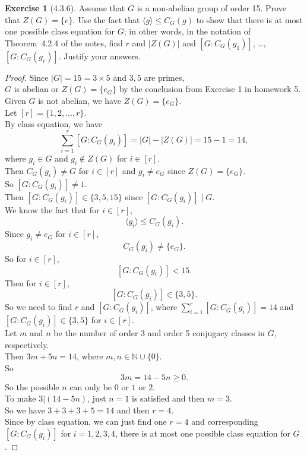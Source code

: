 \documentclass{amsart}
\newcommand{\bbn}{\mathbb{N}}
\theoremstyle{plain}
\theoremstyle{definition}
\newtheorem{exer}[lem]{Exercise}
\begin{document}
\begin{exer}[4.3.6]
Assume that $G$ is a non-abelian group of order 15. 
Prove that $Z(G)=\{e\}$. 
Use the fact that $\langle g\rangle\leq C_G(g)$ to show that there is at most one possible class equation for $G$;
in other words, in the notation of Theorem~4.2.4 of the notes, find $r$ and $|Z(G)|$ and $[G:C_G(g_1)]$, \ldots, $[G:C_G(g_r)]$.
Justify your answers.

\begin{proof}
	Since $|G| = 15 = 3 \times 5$ and $3,5$ are primes, \\
	$G$ is abelian or $Z(G)= \{e_G\}$ by the conclusion from Exercise 1 in homework 5.\\
	Given $G$ is not abelian, we have $Z(G)=\{e_G\}$.\\
	Let $[r] = \{1,2,...,r\}$.\\
	By class equation, we have 
	\[\sum_{i=1}^r [G:C_G(g_i)] = |G|-|Z(G)| = 15-1 = 14,\]
	where $g_i \in G$ and $g_i \not\in Z(G)$ for $i\in [r]$.\\
	Then $C_G(g_i) \neq G$ for $i \in [r]$ and $g_i \neq e_G$ since $Z(G) = \{e_G\}$.\\
	So $[G:C_G(g_i)] \neq 1$.\\
	Then $[G:C_G(g_i)] \in \{3,5,15\}$ since $[G:C_G(g_i)] \mid G$.\\
	We know the fact that for $i \in [r]$, 
  	\[ \langle g_i \rangle \leq C_G(g_i).\]
  	Since $g_i \neq e_G$ for $i \in [r]$,\\
    \[C_G(g_i) \neq \{e_G\}.\]
    So for $i \in [r]$,
    \[[G:C_G(g_i)] < 15.\]
    Then for $i \in [r]$,
    \[[G:C_G(g_i)] \in \{3,5\}.\]
    So we need to find $r$ and $[G:C_G(g_i)]$, where $\sum_{i=1}^r [G:C_G(g_i)] =14$ and $[G:C_G(g_i)] \in \{3,5\}$ for $i \in [r]$.\\
    Let $m$ and $n$ be the number of order 3 and order 5 conjugacy classes in $G$, respectively.\\
    Then $3m+5n =14$, where $m,n \in \bbn \cup \{0\}$.\\
    So
    \[3m = 14-5n \geq 0.\]
    So the possible $n$ can only be $0$ or $1$ or $2$.\\
    To make $3|(14-5n)$, just $n=1$ is satisfied and then $m = 3$.\\
	So we have $3+3+3+5 = 14$ and then $r= 4$.\\ 
    Since by class equation, we can just find one $r=4$ and corresponding $[G:C_G(g_i)]$ for $i = 1,2,3,4$, there is at most one possible class equation for $G$.

\end{proof}

\end{exer}
\end{document}
